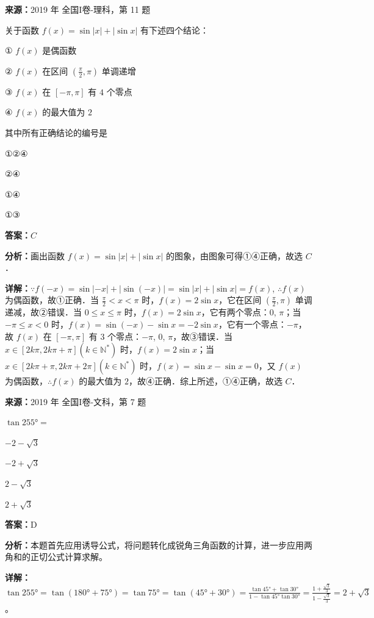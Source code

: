 \begin{question}[points=5]
\textbf{来源：}2019 年 全国I卷-理科，第 11 题\par
关于函数 $f(x) = \sin|x| + |\sin x|$ 有下述四个结论：

① $f(x)$ 是偶函数

② $f(x)$ 在区间 $\left(\frac{\pi}{2}, \pi\right)$ 单调递增

③ $f(x)$ 在 $[-\pi, \pi]$ 有 $4$ 个零点

④ $f(x)$ 的最大值为 $2$

其中所有正确结论的编号是
\begin{choices}
  \item ①②④
  \item ②④
  \item ①④
  \item ①③
\end{choices}
\begin{solution}
\textbf{答案：}$C$

\textbf{分析：}画出函数 $f(x) = \sin|x| + |\sin x|$ 的图象，由图象可得①④正确，故选 $C$．

\textbf{详解：}$\because f(-x) = \sin|-x| + |\sin(-x)| = \sin|x| + |\sin x| = f(x)$, $\therefore f(x)$ 为偶函数，故①正确．当 $\frac{\pi}{2} < x < \pi$ 时，$f(x) = 2\sin x$，它在区间 $\left(\frac{\pi}{2}, \pi\right)$ 单调递减，故②错误．当 $0 \le x \le \pi$ 时，$f(x) = 2\sin x$，它有两个零点：$0$, $\pi$；当 $-\pi \le x < 0$ 时，$f(x) = \sin(-x) - \sin x = -2\sin x$，它有一个零点：$-\pi$，故 $f(x)$ 在 $[-\pi, \pi]$ 有 $3$ 个零点：$-\pi$, $0$, $\pi$，故③错误．当 $x \in [2k\pi, 2k\pi + \pi] (k \in \mathbb{N}^*)$ 时，$f(x) = 2\sin x$；当 $x \in [2k\pi + \pi, 2k\pi + 2\pi] (k \in \mathbb{N}^*)$ 时，$f(x) = \sin x - \sin x = 0$，又 $f(x)$ 为偶函数，$\therefore f(x)$ 的最大值为 $2$，故④正确．综上所述，①④正确，故选 $C$．
\end{solution}
\end{question}

\begin{question}[points=5]
\textbf{来源：}2019 年 全国I卷-文科，第 7 题\par
$\tan 255° =$
\begin{choices}
  \item $-2-\sqrt{3}$
  \item $-2+\sqrt{3}$
  \item $2-\sqrt{3}$
  \item $2+\sqrt{3}$
\end{choices}
\begin{solution}
\textbf{答案：}D

\textbf{分析：}本题首先应用诱导公式，将问题转化成锐角三角函数的计算，进一步应用两角和的正切公式计算求解。

\textbf{详解：}$\tan 255° = \tan(180°+75°) = \tan 75° = \tan(45°+30°) = \frac{\tan 45°+\tan 30°}{1-\tan 45°\tan 30°} = \frac{1+\frac{\sqrt{3}}{3}}{1-\frac{\sqrt{3}}{3}} = 2+\sqrt{3}$。
\end{solution}
\end{question}

